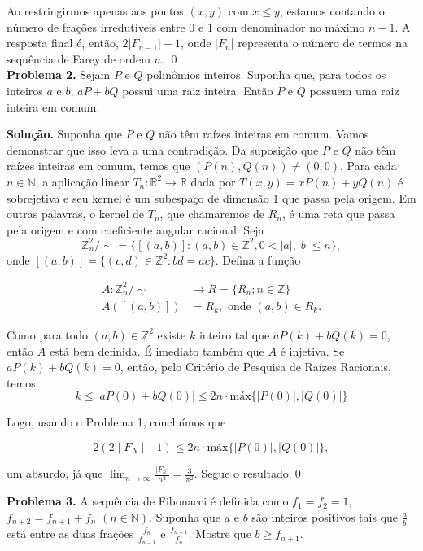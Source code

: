\documentclass{hipatia}
\theoremstyle{definition} %
\begin{document}
Ao restringirmos apenas aos pontos \((x, y)\) com \(x \leq y\), estamos contando o número de frações irredutíveis entre \(0\) e \(1\) com denominador no máximo \(n-1\). A resposta final é, então, \(2|F_{n-1}| - 1\), onde \(|F_n|\) representa o número de termos na sequência de Farey de ordem \(n\). \qed\\

\noindent \textbf{Problema 2.} Sejam $P$ e $Q$ polinômios inteiros. Suponha que, para todos os inteiros $a$ e $b$, $aP + bQ$ possui uma raiz inteira. Então $P$ e $Q$ possuem uma raiz inteira em comum.\vspace{0.2cm}

\noindent\textbf{Solução.} Suponha que \( P \) e \( Q \) não têm raízes inteiras em comum. Vamos demonstrar que isso leva a uma contradição. Da suposição que \( P \) e \( Q \) não têm raízes inteiras em comum, temos que $(P(n),Q(n))\neq (0,0)$. Para cada $n\in\mathbb{N}$, a aplicação linear $T_n:\mathbb{R}^2\to\mathbb{R}$ dada por $T(x,y)=xP(n)+yQ(n)$ é sobrejetiva e seu kernel é um subespaço de dimensão 1 que passa pela origem. Em outras palavras, o kernel de $T_n$, que chamaremos de $R_n$, é uma reta que passa pela origem e com coeficiente angular racional. Seja
$$
\mathbb{Z}_n^2/{\sim} = \{[(a,b)] : (a,b) \in \mathbb{Z}^2, 0 < |a|, |b| \leq n\}, 
$$
\noindent onde $[(a,b)] = \{(c,d) \in \mathbb{Z}^2 : bd = ac\}$. Defina a função  

\begin{align*}
A:\mathbb{Z}_n^2/{\sim} &\to R=\{R_n;n\in\mathbb{Z}\} \\
A([(a,b)]) &= R_k, \text{ onde } (a,b)\in R_k.
\end{align*}

Como para todo $(a,b)\in\mathbb{Z}^2$ existe $k$ inteiro tal que $aP(k)+bQ(k)=0$, então $A$ está bem definida. É imediato também que $A$ é injetiva. Se $aP(k)+bQ(k)=0$, então, pelo Critério de Pesquisa de Raízes Racionais, temos
$$
k\leq \mid aP(0)+bQ(0)\mid\leq 2n\cdot\text{máx}\{\mid P(0)\mid,\mid Q(0)\mid\}
$$

Logo, usando o Problema 1, concluímos que 

$$
2(2\mid F_N\mid-1)\leq 2n\cdot \text{máx}\{\mid P(0)\mid,\mid Q(0)\mid\},
$$

\noindent um absurdo, já que $\lim _{n \rightarrow \infty} \frac{\left|F_n\right|}{n^2}=\frac{3}{\pi^2}$. Segue o resultado.\qed\vspace{0.2cm}


\noindent \textbf{Problema 3.} A sequência de Fibonacci é definida como $f_1 = f_2 = 1$, $f_{n+2} = f_{n+1} + f_n$ $(n \in \mathbb{N})$. Suponha que $a$ e $b$ são inteiros positivos tais que $\frac{a}{b}$ está entre as duas frações $\frac{f_n}{f_{n-1}}$ e $\frac{f_{n+1}}{f_n}$. Mostre que $b \geq f_{n+1}$.\vspace{0.2cm}
\end{document}
